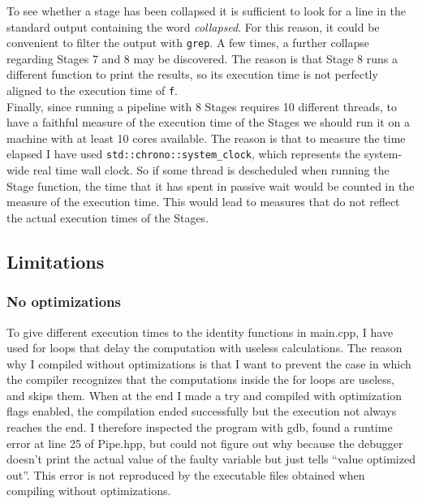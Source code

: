 \documentclass[12pt]{article}
\begin{document}
To see whether a stage has been collapsed it is sufficient to look for a line in the standard output containing the word \textit{collapsed}. For this reason, it could be convenient to filter the output with \texttt{grep}. A few times, a further collapse regarding Stages 7 and 8 may be discovered. The reason is that Stage 8 runs a different function to print the results, so its execution time is not perfectly aligned to the execution time of \texttt{f}. \\  
Finally, since running a pipeline with 8 Stages requires 10 different threads, to have  a faithful measure of the execution time of the Stages we should run it on a machine with at least 10 cores available. The reason is that to measure the time elapsed I have used  \texttt{std::chrono::system\_clock}, which represents the system-wide real time wall clock. So if some thread is descheduled when running the Stage function, the time that it has spent in passive wait would be counted in the measure of the execution time. This would lead to measures that do not reflect the actual execution times of the Stages.
\subsection{Limitations}
\subsubsection{No optimizations} To give different execution times to the identity functions in main.cpp, I have used for loops that delay the computation with useless calculations. The reason why I compiled without optimizations is that I want to prevent the case in which the compiler recognizes that the computations inside the for loops are useless, and skips them. When at the end I made a try and compiled with optimization flags enabled, the compilation ended successfully but the execution not always reaches the end. I therefore inspected the program with gdb, found a runtime error at line 25 of Pipe.hpp, but could not figure out why because the debugger doesn't print the actual value of the faulty variable but just tells ``value optimized out''. This error is not reproduced by the executable files obtained when compiling without optimizations.
\end{document}
